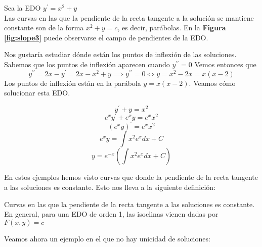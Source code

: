 \documentclass{mathnotes}
\begin{document}

\begin{example}
Sea la EDO $y^\prime = x^2+y$\\
Las curvas en las que la pendiente de la recta tangente a la solución se mantiene constante son de la forma $x^2+y=c$, es decir, parábolas. En la \textbf{Figura \ref{fig:slope3}} puede observarse el campo de pendientes de la EDO.

Nos gustaría estudiar dónde están los puntos de inflexión de las soluciones. Sabemos que los puntos de inflexión aparecen cuando $y^{\prime\prime} = 0$
Vemos entonces que
$$y^{\prime\prime} =  2x-y^\prime = 2x-x^2+y \implies y^{\prime\prime} = 0 \iff y = x^2-2x=x(x-2)$$
Los puntos de inflexión están en la parábola $y=x(x-2)$.
Veamos cómo solucionar esta EDO.

$$y^\prime + y = x^2$$
$$e^xy^\prime + e^xy = e^xx^2$$
$$(e^xy)^\prime = e^xx^2$$
$$e^xy = \int x^2e^xdx + C$$
$$y = e^{-x}(\int x^2e^xdx+C)$$
\end{example}

En estos ejemplos hemos visto curvas que donde la pendiente de la recta tangente a las soluciones es constante. Esto nos lleva a la siguiente definición:

\begin{definition}
Curvas en las que la pendiente de la recta tangente a las soluciones es constante.
En general, para una EDO de orden 1, las isoclinas vienen dadas por $F(x,y) = c$
\end{definition}

Veamos ahora un ejemplo en el que no hay unicidad de soluciones:
\end{document}
